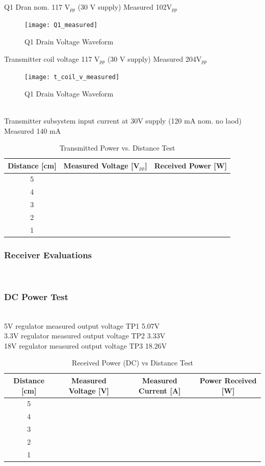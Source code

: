 \documentclass[12pt]{article}
\begin{document}
\noindent
Q1 Dran nom. 117 V$_{pp}$ (30 V supply) Measured 102V$_{pp}$
\hfill
\begin{figure}[h!]
\centering
\texttt{[image: Q1\_measured]}
\caption{Q1 Drain Voltage Waveform}
\end{figure}

\noindent
Transmitter coil voltage 117 V$_{pp}$ (30 V supply) Measured 204V$_{pp}$
\hfill
\begin{figure}[h!]
\centering
\texttt{[image: t\_coil\_v\_measured]}
\caption{Q1 Drain Voltage Waveform}
\end{figure}
\hfill 
\pagebreak
\hfill \\
\noindent
Transmitter subsystem input current at 30V supply (120 mA nom. no laod) Measured 140 mA

\begin{table}[h!]
\centering
\caption{Transmitted Power vs. Distance Test}
\begin{tabular}{ | c | c | c | }
\hline
 Distance [cm] & Measured Voltage [V$_{pp}$] & Received Power [W] \\
 \hline
5 & & \\
\hline
4 & & \\
\hline
3 & & \\
\hline
2 & & \\
\hline
1 & & \\
\hline
\end{tabular}
\end{table}

\subsubsection{Receiver Evaluations} \hfill \\
\subsubsection*{DC Power Test} \hfill \\
\noindent
5V regulator measured output voltage TP1 5.07V\\
3.3V regulator measured output voltage TP2 3.33V\\
18V regulator measured output voltage TP3 18.26V\\

\begin{table}[h!]
\centering
\caption{Received Power (DC) vs Distance Test}
\begin{tabular}{ | c | c | c |  c |}
\hline
Distance [cm] & Measured Voltage [V] & Measured Current [A] & Power Received [W] \\
\hline
5 & & & \\
\hline
4 & & & \\
\hline
3 & & & \\
\hline
2 & & & \\
\hline
1 & & & \\
\hline
\end{tabular}
\end{table}
\end{document}
